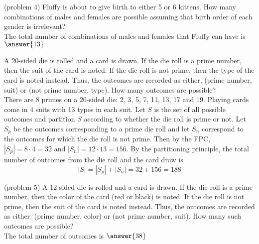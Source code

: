 \documentclass[handout]{ximera}
\begin{document}
\begin{problem}(problem 4)
Fluffy is about to give birth to either 5 or 6 kittens.  
How many combinations of males and females are possible assuming 
that birth order of each gender is irrelevant?\\
The total number of combinations of males and females that Fluffy can have is
$\answer{13}$
\end{problem}

\begin{example}[example 5]
    A 20-sided die is rolled and a card is drawn. If the die roll is a prime number, then the suit of the card is noted. If the die roll is not prime, then the type of the card is noted instead.
    Thus, the outcomes are recorded as either, (prime number, suit) or (not prime number, type). How many outcomes are possible?\\
    There are 8 primes on a 20-sided die: 2, 3, 5, 7, 11, 13, 17 and 19. Playing cards come in 4 suits with 13 types in each suit.    
    Let $S$ is the set of all possible outcomes and partition $S$ according to whether the die roll is prime or not. 
    Let $S_p$ be the outcomes corresponding to a prime die roll and let $S_n$ correspond to the outcomes for which the die roll is not prime.
    Then by the FPC, $|S_p| = 8 \cdot 4 = 32$ and $|S_n| = 12 \cdot 13 = 156$. 
     By the partitioning principle, the total number of outcomes from the die roll and the card draw is
     \[
     |S| = |S_p|+|S_n|= 32 + 156 = 188
     \]
     \end{example}
     
    
    \begin{problem}(problem 5)
        A 12-sided die is rolled and a card is drawn. If the die roll is a prime number, then the color of the card (red or black) is noted. If the die roll is not prime, 
        then the suit of the card is noted instead.  Thus, the outcomes are recorded as either: (prime number, color) or (not prime number, suit). How many such outcomes are possible?\\
    The total number of outcomes is
    $\answer{38}$
    \end{problem}
\end{document}
